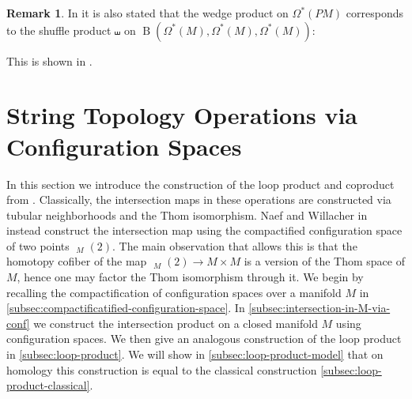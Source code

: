 \documentclass{scrartcl}
\theoremstyle{plain}
\theoremstyle{definition}
\newtheorem{remark}[theorem]{Remark}
\DeclareMathOperator{\BC}{B}
\DeclareMathOperator{\cConf}{\overline{Conf}}
\begin{document}
\begin{remark}
    In \cite{naef2019string} it is also stated that the wedge product on $\Omega^*(PM)$ corresponds to the shuffle product $\shuffle$ on $\BC(\Omega^*(M), \Omega^*(M), \Omega^*(M))$:
    \begin{center}
    \end{center}
    This is shown in \cite[4.1]{chen1973iterated}.

\end{remark}





\section{String Topology Operations via Configuration Spaces}\label{sec:string-ops-via-cfg-spaces}

In this section we introduce the construction of the loop product and coproduct from \cite{naef2019string}. Classically, the intersection maps in these operations are constructed via tubular neighborhoods and the Thom isomorphism. Naef and Willacher in \cite{naef2019string} instead construct the intersection map using the compactified configuration space of two points $\cConf_M(2)$. The main observation that allows this is that the homotopy cofiber of the map $\cConf_M(2)\to M\times M$ is a version of the Thom space of $M$, hence one may factor the Thom isomorphism through it. We begin by recalling the compactification of configuration spaces over a manifold $M$ in \cref{subsec:compactificatified-configuration-space}. In \cref{subsec:intersection-in-M-via-conf} we construct the intersection product on a closed manifold $M$ using configuration spaces. We then give an analogous construction of the loop product in \cref{subsec:loop-product}. We will show in \cref{subsec:loop-product-model} that on homology this construction is equal to the classical construction \ref{subsec:loop-product-classical}. 
\end{document}
